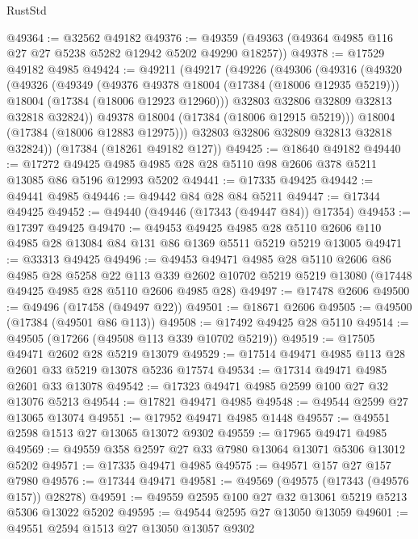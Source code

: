 \begin{lexlean}{RustStd}
\begin{coremodule}
@49364 := @32562 @49182
@49376 := @49359 (@49363 (@49364 @4985 @116 @27 @27 @5238 @5282 @12942 @5202 @49290 @18257))
@49378 := @17529 @49182 @4985
@49424 := @49211
    (@49217
      (@49226
        (@49306
          (@49316
            (@49320
              (@49326
                (@49349
                  (@49376 @49378 @18004 (@17384 (@18006 @12935 @5219)))
                  @18004
                  (@17384 (@18006 @12923 @12960)))
                @32803
                @32806
                @32809
                @32813
                @32818
                @32824))
            @49378
            @18004
            (@17384 (@18006 @12915 @5219)))
          @18004
          (@17384 (@18006 @12883 @12975)))
        @32803
        @32806
        @32809
        @32813
        @32818
        @32824))
    (@17384 (@18261 @49182 @127))
@49425 := @18640 @49182
@49440 := @17272 @49425 @4985 @4985 @28 @28 @5110 @98 @2606 @378 @5211 @13085 @86 @5196 @12993 @5202
@49441 := @17335 @49425
@49442 := @49441 @4985
@49446 := @49442 @84 @28 @84 @5211
@49447 := @17344 @49425
@49452 := @49440 (@49446 (@17343 (@49447 @84)) @17354)
@49453 := @17397 @49425
@49470 := @49453
    @49425
    @4985
    @28
    @5110
    @2606
    @110
    @4985
    @28
    @13084
    @84
    @131
    @86
    @1369
    @5511
    @5219
    @5219
    @13005
@49471 := @33313 @49425
@49496 := @49453
    @49471
    @4985
    @28
    @5110
    @2606
    @86
    @4985
    @28
    @5258
    @22
    @113
    @339
    @2602
    @10702
    @5219
    @5219
    @13080
    (@17448 @49425 @4985 @28 @5110 @2606 @4985 @28)
@49497 := @17478 @2606
@49500 := @49496 (@17458 (@49497 @22))
@49501 := @18671 @2606
@49505 := @49500 (@17384 (@49501 @86 @113))
@49508 := @17492 @49425 @28 @5110
@49514 := @49505 (@17266 (@49508 @113 @339 @10702 @5219))
@49519 := @17505 @49471 @2602 @28 @5219 @13079
@49529 := @17514 @49471 @4985 @113 @28 @2601 @33 @5219 @13078 @5236 @17574
@49534 := @17314 @49471 @4985 @2601 @33 @13078
@49542 := @17323 @49471 @4985 @2599 @100 @27 @32 @13076 @5213
@49544 := @17821 @49471 @4985
@49548 := @49544 @2599 @27 @13065 @13074
@49551 := @17952 @49471 @4985 @1448
@49557 := @49551 @2598 @1513 @27 @13065 @13072 @9302
@49559 := @17965 @49471 @4985
@49569 := @49559 @358 @2597 @27 @33 @7980 @13064 @13071 @5306 @13012 @5202
@49571 := @17335 @49471 @4985
@49575 := @49571 @157 @27 @157 @7980
@49576 := @17344 @49471
@49581 := @49569 (@49575 (@17343 (@49576 @157)) @28278)
@49591 := @49559 @2595 @100 @27 @32 @13061 @5219 @5213 @5306 @13022 @5202
@49595 := @49544 @2595 @27 @13050 @13059
@49601 := @49551 @2594 @1513 @27 @13050 @13057 @9302

\end{coremodule}
\end{lexlean}

